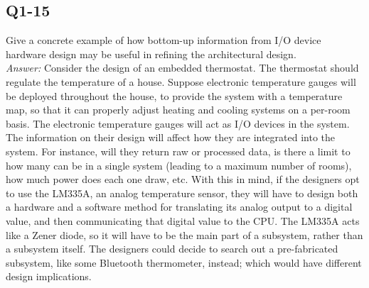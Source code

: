 \documentclass{article}
\begin{document}
\subsection*{ Q1-15 }%
Give a concrete example of how bottom-up information from I/O device hardware design may be useful in refining the architectural design. 
\\
\emph{Answer:}
Consider the design of an embedded thermostat. The thermostat should regulate the temperature of a house. Suppose electronic temperature gauges will be deployed throughout the house, to provide the system with a temperature map, so that it can properly adjust heating and cooling systems on a per-room basis. The electronic temperature gauges will act as I/O devices in the system. The information on their design will affect how they are integrated into the system. For instance, will they return raw or processed data, is there a limit to how many can be in a single system (leading to a maximum number of rooms), how much power does each one draw, etc. With this in mind, if the designers opt to use the LM335A, an analog temperature sensor, they will have to design both a hardware and a software method for translating its analog output to a digital value, and then communicating that digital value to the CPU. The LM335A acts like a Zener diode, so it will have to be the main part of a subsystem, rather than a subsystem itself. The designers could decide to search out a pre-fabricated subsystem, like some Bluetooth thermometer, instead; which would have different design implications. 

\newpage
\end{document}
